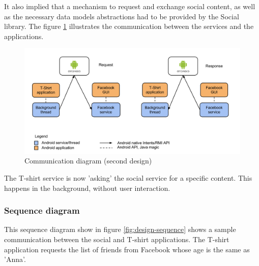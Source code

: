 It also implied that a mechanism to request and exchange social content, as well as the necessary
data models abstractions had to be provided by the Social library. The figure \ref{fig:design-reqresp}
illustrates the communication between the services and the applications.

\begin{figure}[h!]
	\centering \includegraphics[scale=0.35]{img/design-reqresp.png}
	\caption{Communication diagram (second design)}
	\label{fig:design-reqresp}
\end{figure}

The T-shirt service is now 'asking' the social service for a specific content.
This happens in the background, without user interaction.

\subsubsection{Sequence diagram}
This sequence diagram show in figure \ref{fig:design-sequence} shows a sample communication between the social and T-shirt applications.
The T-shirt application requests the list of friends from Facebook whose age is the same as 'Anna'.

